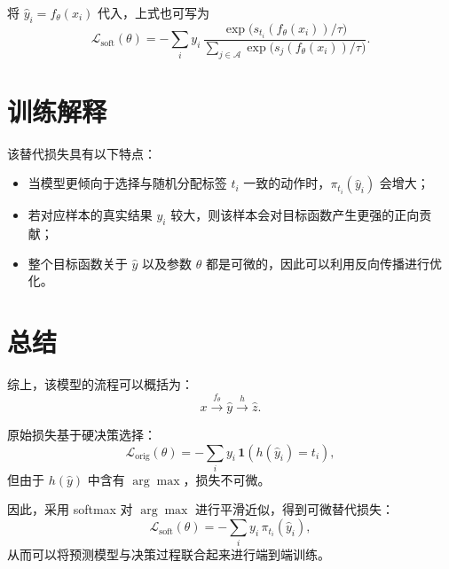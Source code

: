 \documentclass{article}
\begin{document}
将 \(\hat y_i=f_\theta(x_i)\) 代入，上式也可写为
\begin{equation}
\mathcal{L}_{\text{soft}}(\theta)
=
- \sum_i y_i \,
\frac{
\exp\!\bigl(s_{t_i}(f_\theta(x_i))/\tau\bigr)
}{
\sum_{j\in\mathcal{A}}
\exp\!\bigl(s_j(f_\theta(x_i))/\tau\bigr)
}.
\end{equation}

\section{训练解释}

该替代损失具有以下特点：

\begin{itemize}
    \item 当模型更倾向于选择与随机分配标签 \(t_i\) 一致的动作时，\(\pi_{t_i}(\hat y_i)\) 会增大；
    \item 若对应样本的真实结果 \(y_i\) 较大，则该样本会对目标函数产生更强的正向贡献；
    \item 整个目标函数关于 \(\hat y\) 以及参数 \(\theta\) 都是可微的，因此可以利用反向传播进行优化。
\end{itemize}

\section{总结}

综上，该模型的流程可以概括为：
\begin{equation}
x \xrightarrow{f_\theta} \hat y \xrightarrow{h} \hat z.
\end{equation}

原始损失基于硬决策选择：
\begin{equation}
\mathcal{L}_{\text{orig}}(\theta)
=
- \sum_i y_i \, \mathbf{1}\!\left(h(\hat y_i)=t_i\right),
\end{equation}
但由于 \(h(\hat y)\) 中含有 \(\arg\max\)，损失不可微。

因此，采用 softmax 对 \(\arg\max\) 进行平滑近似，得到可微替代损失：
\begin{equation}
\mathcal{L}_{\text{soft}}(\theta)
=
- \sum_i y_i \, \pi_{t_i}(\hat y_i),
\end{equation}
从而可以将预测模型与决策过程联合起来进行端到端训练。
\end{document}
